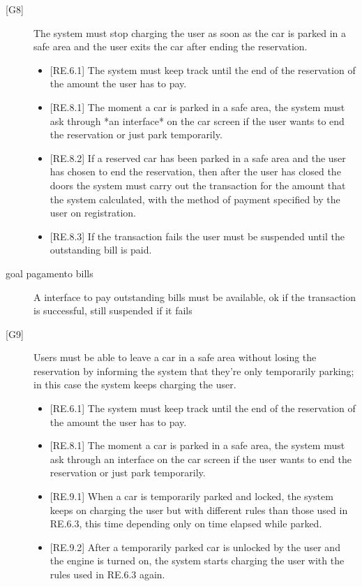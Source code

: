 \documentclass[english]{article}
\begin{document}
\begin{description}
\item[{[G8]}]{The system must stop charging the user as soon as the car is parked in a safe area and the user exits the car after ending the reservation.
\begin{itemize}
	\item{[RE.6.1] The system must keep track until the end of the reservation of the amount the user has to pay.}
	\item{[RE.8.1] The moment a car is parked in a safe area, the system must ask through *an interface* on the car screen if the user wants to end the reservation or just park temporarily.}
	\item{[RE.8.2] If a reserved car has been parked in a safe area and the user has chosen to end the reservation, then after the user has closed the doors the system must carry out the transaction for the amount that the system calculated, with the method of payment specified by the user on registration.}
	\item{[RE.8.3] If the transaction fails the user must be suspended until the outstanding bill is paid.}
\end{itemize}
}

\item[goal pagamento bills]{A interface to pay outstanding bills must be available, ok if the transaction is successful, still suspended if it fails}

\item[{[G9]}]{Users must be able to leave a car in a safe area without losing the reservation by informing the system that they’re only temporarily parking; in this case the system keeps charging the user.
\begin{itemize}
	\item{[RE.6.1] The system must keep track until the end of the reservation of the amount the user has to pay.}
	\item{[RE.8.1] The moment a car is parked in a safe area, the system must ask through an interface on the car screen if the user wants to end the reservation or just park temporarily.}
	\item{[RE.9.1] When a car is temporarily parked and locked, the system keeps on charging the user but with different rules than those used in RE.6.3, this time depending only on time elapsed while parked.}
	\item{[RE.9.2] After a temporarily parked car is unlocked by the user and the engine is turned on, the system starts charging the user with the rules used in RE.6.3 again.}
\end{itemize}
}


\end{description}
\end{document}
